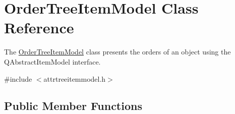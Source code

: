 \hypertarget{class_order_tree_item_model}{\section{\-Order\-Tree\-Item\-Model \-Class \-Reference}
\label{class_order_tree_item_model}
}


\-The \hyperlink{class_order_tree_item_model}{\-Order\-Tree\-Item\-Model} class presents the orders of an object using the \-Q\-Abstract\-Item\-Model interface.  




{\ttfamily \#include $<$attrtreeitemmodel.\-h$>$}

\subsection*{\-Public \-Member \-Functions}

